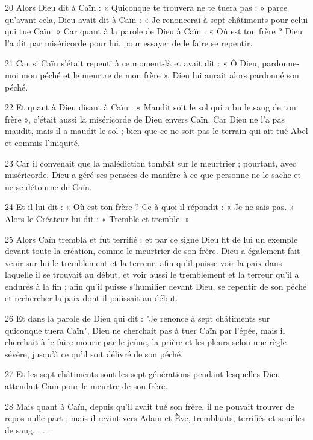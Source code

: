 \par 20 Alors Dieu dit à Caïn : « Quiconque te trouvera ne te tuera pas ; » parce qu’avant cela, Dieu avait dit à Caïn : « Je renoncerai à sept châtiments pour celui qui tue Caïn. » Car quant à la parole de Dieu à Caïn : « Où est ton frère ? Dieu l'a dit par miséricorde pour lui, pour essayer de le faire se repentir.

\par 21 Car si Caïn s'était repenti à ce moment-là et avait dit : « Ô Dieu, pardonne-moi mon péché et le meurtre de mon frère », Dieu lui aurait alors pardonné son péché.

\par 22 Et quant à Dieu disant à Caïn : « Maudit soit le sol qui a bu le sang de ton frère », c'était aussi la miséricorde de Dieu envers Caïn. Car Dieu ne l'a pas maudit, mais il a maudit le sol ; bien que ce ne soit pas le terrain qui ait tué Abel et commis l'iniquité.

\par 23 Car il convenait que la malédiction tombât sur le meurtrier ; pourtant, avec miséricorde, Dieu a géré ses pensées de manière à ce que personne ne le sache et ne se détourne de Caïn.

\par 24 Et il lui dit : « Où est ton frère ? Ce à quoi il répondit : « Je ne sais pas. » Alors le Créateur lui dit : « Tremble et tremble. »

\par 25 Alors Caïn trembla et fut terrifié ; et par ce signe Dieu fit de lui un exemple devant toute la création, comme le meurtrier de son frère. Dieu a également fait venir sur lui le tremblement et la terreur, afin qu'il puisse voir la paix dans laquelle il se trouvait au début, et voir aussi le tremblement et la terreur qu'il a endurés à la fin ; afin qu'il puisse s'humilier devant Dieu, se repentir de son péché et rechercher la paix dont il jouissait au début.

\par 26 Et dans la parole de Dieu qui dit : "Je renonce à sept châtiments sur quiconque tuera Caïn", Dieu ne cherchait pas à tuer Caïn par l'épée, mais il cherchait à le faire mourir par le jeûne, la prière et les pleurs selon une règle sévère, jusqu'à ce qu'il soit délivré de son péché.

\par 27 Et les sept châtiments sont les sept générations pendant lesquelles Dieu attendait Caïn pour le meurtre de son frère.

\par 28 Mais quant à Caïn, depuis qu'il avait tué son frère, il ne pouvait trouver de repos nulle part ; mais il revint vers Adam et Ève, tremblants, terrifiés et souillés de sang. . . .


